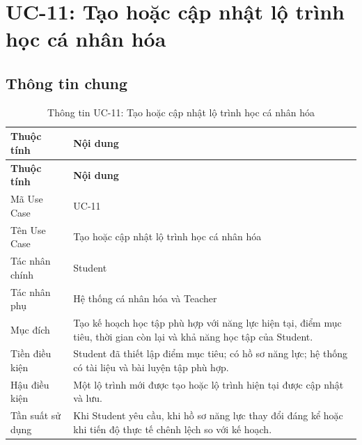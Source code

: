 \section{UC-11: Tạo hoặc cập nhật lộ trình học cá nhân hóa}
\label{sec:uc11-learning-path}

\subsection{Thông tin chung}

\begin{longtable}{|p{4.2cm}|p{10.2cm}|}
	\caption{Thông tin UC-11: Tạo hoặc cập nhật lộ trình học cá nhân hóa}
	\label{tab:uc11-info}\\
	\hline
	\textbf{Thuộc tính} & \textbf{Nội dung} \\
	\hline
	\endfirsthead
	
	\hline
	\textbf{Thuộc tính} & \textbf{Nội dung} \\
	\hline
	\endhead
	
	Mã Use Case &
	UC-11 \\
	\hline
	
	Tên Use Case &
	Tạo hoặc cập nhật lộ trình học cá nhân hóa \\
	\hline
	
	Tác nhân chính &
	Student \\
	\hline
	
	Tác nhân phụ &
	Hệ thống cá nhân hóa và Teacher \\
	\hline
	
	Mục đích &
	Tạo kế hoạch học tập phù hợp với năng lực hiện tại, điểm mục tiêu, thời
	gian còn lại và khả năng học tập của Student. \\
	\hline
	
	Tiền điều kiện &
	Student đã thiết lập điểm mục tiêu; có hồ sơ năng lực; hệ thống có tài
	liệu và bài luyện tập phù hợp. \\
	\hline
	
	Hậu điều kiện &
	Một lộ trình mới được tạo hoặc lộ trình hiện tại được cập nhật và lưu. \\
	\hline
	
	Tần suất sử dụng &
	Khi Student yêu cầu, khi hồ sơ năng lực thay đổi đáng kể hoặc khi tiến
	độ thực tế chênh lệch so với kế hoạch. \\
	\hline
	
\end{longtable}

